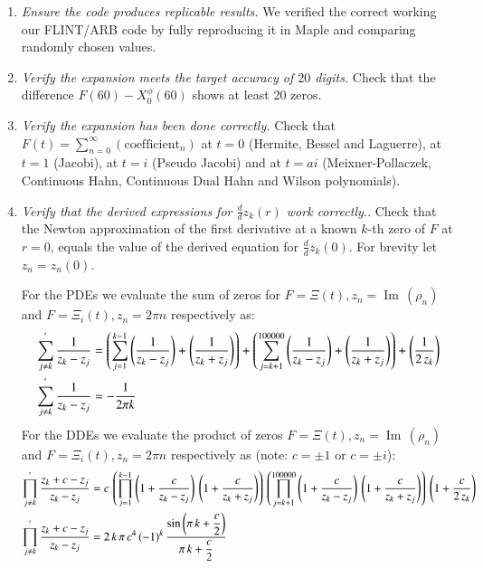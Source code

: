 \documentclass[a4paper,11pt,twoside]{amsart}
\renewcommand\Im{{\operatorname{Im\,}}}
\begin{document}
\begin{enumerate}
\item \textit{Ensure the code produces replicable results.} We verified the correct working our FLINT/ARB code by fully reproducing it in Maple\texttrademark  \cite{map} and comparing randomly chosen values. 
\item  \textit{Verify the expansion meets the target accuracy of $20$ digits.} Check that the difference $F(60)-X^\phi_0(60)$ shows at least $20$ zeros.
\item  \textit{Verify the expansion has been done correctly.} Check that $F(t) = \sum_{n=0}^\infty (\text{coefficient}_n)$ at $t=0$ (Hermite, Bessel and Laguerre), at $t=1$ (Jacobi), at $t=i$ (Pseudo Jacobi) and at $t=ai$ (Meixner-Pollaczek, Continuous Hahn, Continuous Dual Hahn and Wilson polynomials). 
\item \textit{Verify that the derived expressions for $\frac{d}{d}z_k(r)$ work correctly.}. Check that the Newton approximation of the first derivative at a known $k$-th zero of $F$ at $r=0$, equals the value of the derived equation for $\frac{d}{d}z_k(0)$. For brevity let $z_n = z_n(0)$. 

For the PDEs we evaluate the sum of zeros for $F=\Xi(t), z_n=\Im(\rho_n)$ and $F=\Xi_i(t), z_n=2\pi n$ respectively as:
\begin{align}
 \sum_{j \ne k}^{'} \frac{1}{z_k-z_j} &= \left(\sum_{j =1}^{k-1} \left(\frac{1}{z_k-z_j}\right)+\left(\frac{1}{z_k+z_j}\right)\right) +\left(\sum_{j = k+1}^{100000} \left(\frac{1}{z_k-z_j}\right)+\left(\frac{1}{z_k+z_j}\right)\right)+\left(\frac{1}{2\,z_k} \right) \notag \\
  \sum_{j \ne k}^{'} \frac{1}{z_k-z_j} &= -\frac{1}{2\pi k} \notag
\end{align}
For the DDEs we evaluate the product of zeros $F=\Xi(t), z_n=\Im(\rho_n)$ and $F=\Xi_i(t), z_n=2\pi n$ respectively as (note: $c =\pm 1$ or $c =\pm i$):
\begin{align}
 \prod_{j \ne k}^{'} \frac{z_k+c-z_j}{z_k-z_j} &= c\,\left(\prod_{j =1}^{k-1} \left(1+\frac{c}{z_k-z_j}\right)\,\left(1+\frac{c}{z_k+z_j}\right)\right)\,\left(\prod_{j = k+1}^{100000} \left(1+\frac{c}{z_k-z_j}\right)\,\left(1+\frac{c}{z_k+z_j}\right)\right)\,\left(1+\frac{c}{2\,z_k} \right) \notag \\
 \prod_{j \ne k}^{'} \frac{z_k+c-z_j}{z_k-z_j} &= 2\,k\,\pi\,c^4\,(-1)^k\,\frac{\sin\left(\pi\,k+\dfrac{c}{2}\right)}{\pi\,k+\dfrac{c}{2}} \notag
\end{align}
\end{enumerate}
\end{document}
